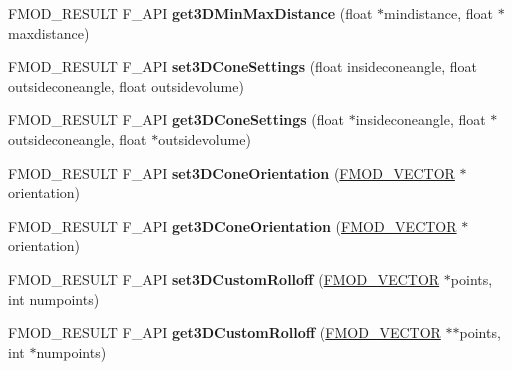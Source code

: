 \begin{DoxyCompactItemize}
\item 
\hypertarget{class_f_m_o_d_1_1_channel_control_ab8dadcd83013ea4826bd8e44cb73ebc5}{F\+M\+O\+D\+\_\+\+R\+E\+S\+U\+L\+T F\+\_\+\+A\+P\+I {\bfseries get3\+D\+Min\+Max\+Distance} (float $\ast$mindistance, float $\ast$maxdistance)}\label{class_f_m_o_d_1_1_channel_control_ab8dadcd83013ea4826bd8e44cb73ebc5}

\item 
\hypertarget{class_f_m_o_d_1_1_channel_control_ab65692317899c31d68e84cb1127840ff}{F\+M\+O\+D\+\_\+\+R\+E\+S\+U\+L\+T F\+\_\+\+A\+P\+I {\bfseries set3\+D\+Cone\+Settings} (float insideconeangle, float outsideconeangle, float outsidevolume)}\label{class_f_m_o_d_1_1_channel_control_ab65692317899c31d68e84cb1127840ff}

\item 
\hypertarget{class_f_m_o_d_1_1_channel_control_a2189e119ad2569ffdc58396deb9f8967}{F\+M\+O\+D\+\_\+\+R\+E\+S\+U\+L\+T F\+\_\+\+A\+P\+I {\bfseries get3\+D\+Cone\+Settings} (float $\ast$insideconeangle, float $\ast$outsideconeangle, float $\ast$outsidevolume)}\label{class_f_m_o_d_1_1_channel_control_a2189e119ad2569ffdc58396deb9f8967}

\item 
\hypertarget{class_f_m_o_d_1_1_channel_control_a593550467390c1786ca195d1092010b1}{F\+M\+O\+D\+\_\+\+R\+E\+S\+U\+L\+T F\+\_\+\+A\+P\+I {\bfseries set3\+D\+Cone\+Orientation} (\hyperlink{struct_f_m_o_d___v_e_c_t_o_r}{F\+M\+O\+D\+\_\+\+V\+E\+C\+T\+O\+R} $\ast$orientation)}\label{class_f_m_o_d_1_1_channel_control_a593550467390c1786ca195d1092010b1}

\item 
\hypertarget{class_f_m_o_d_1_1_channel_control_ac38d4525218249954c2efc5d55cec048}{F\+M\+O\+D\+\_\+\+R\+E\+S\+U\+L\+T F\+\_\+\+A\+P\+I {\bfseries get3\+D\+Cone\+Orientation} (\hyperlink{struct_f_m_o_d___v_e_c_t_o_r}{F\+M\+O\+D\+\_\+\+V\+E\+C\+T\+O\+R} $\ast$orientation)}\label{class_f_m_o_d_1_1_channel_control_ac38d4525218249954c2efc5d55cec048}

\item 
\hypertarget{class_f_m_o_d_1_1_channel_control_abf2c27cef2ec7500559855aa270b8669}{F\+M\+O\+D\+\_\+\+R\+E\+S\+U\+L\+T F\+\_\+\+A\+P\+I {\bfseries set3\+D\+Custom\+Rolloff} (\hyperlink{struct_f_m_o_d___v_e_c_t_o_r}{F\+M\+O\+D\+\_\+\+V\+E\+C\+T\+O\+R} $\ast$points, int numpoints)}\label{class_f_m_o_d_1_1_channel_control_abf2c27cef2ec7500559855aa270b8669}

\item 
\hypertarget{class_f_m_o_d_1_1_channel_control_af4cafc98f162dab49c4eb17ac547ec3e}{F\+M\+O\+D\+\_\+\+R\+E\+S\+U\+L\+T F\+\_\+\+A\+P\+I {\bfseries get3\+D\+Custom\+Rolloff} (\hyperlink{struct_f_m_o_d___v_e_c_t_o_r}{F\+M\+O\+D\+\_\+\+V\+E\+C\+T\+O\+R} $\ast$$\ast$points, int $\ast$numpoints)}\label{class_f_m_o_d_1_1_channel_control_af4cafc98f162dab49c4eb17ac547ec3e}


\end{DoxyCompactItemize}

